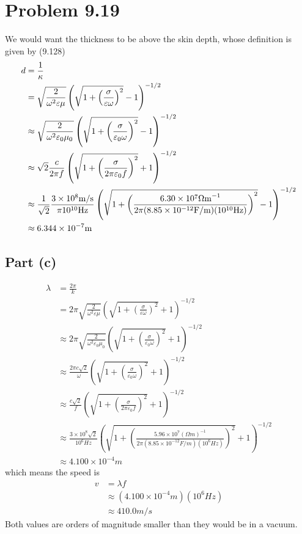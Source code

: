 \documentclass[12pt]{article}
\newcommand{\enterProblemHeader}[1]{
	\rhead{#1}
}
\newenvironment{homeworkProblem}[1]{
    \section{Problem #1}
    \enterProblemHeader{#1}
}{
	\pagebreak
}
\begin{document}
\begin{homeworkProblem}{9.19}
	We would want the thickness to be above the skin depth, whose definition is
	given by (9.128)
	\begin{align*}
		d &= \frac 1 \kappa\\
		&= \sqrt{ \frac 2 { \omega^2 \varepsilon \mu }} \left( \sqrt{1 + \left(
		\frac \sigma {\varepsilon \omega} \right)^2 } - 1 \right)^{-1/2}\\
		&\approx \sqrt{ \frac 2 { \omega^2 \varepsilon_0 \mu_0 }} \left( \sqrt{1 +
		\left( \frac \sigma {\varepsilon_0 \omega} \right)^2 } - 1
		\right)^{-1/2}\\
		&\approx \sqrt{2} \frac c {2 \pi f} \left( \sqrt{ 1 + \left( \frac
		\sigma {2 \pi \varepsilon_0 f} \right)^2 } + 1 \right)^{-1/2}\\
		&\approx \frac 1 {\sqrt 2} \frac {3 \times 10^8 \si{m/ \cancel s}} {\pi
		10^{10} \si{Hz} } \left( \sqrt{1 + \left( \frac {6.30 \times 10^7
		\si{\Omega m}^{-1} } {2 \pi (8.85 \times 10^{-12} \si{F/m}) (10^{10}
		\si{Hz}) } \right)^2 } - 1 \right)^{-1/2}\\
		&\approx 6.344 \times 10^{-7} \si{m}
	\end{align*}

	\subsection{Part (c)}
	\begin{align*}
		\lambda &= \frac {2 \pi} k\\
		&= 2 \pi \sqrt{ \frac 2 { \omega^2 \varepsilon \mu }} \left( \sqrt{1 +
		\left( \frac \sigma {\varepsilon \omega} \right)^2 } + 1
		\right)^{-1/2}\\
		&\approx 2 \pi \sqrt{ \frac 2 { \omega^2 \varepsilon_0 \mu_0 }} \left(
		\sqrt{1 + \left( \frac \sigma {\varepsilon_0 \omega} \right)^2 } + 1
		\right)^{-1/2}\\
		&\approx \frac {2 \pi c \sqrt 2} \omega \left( \sqrt{1 + \left( \frac
		\sigma {\varepsilon_0 \omega} \right)^2 } + 1 \right)^{-1/2}\\
		&\approx \frac {c \sqrt 2} f \left( \sqrt{1 + \left( \frac \sigma {2 \pi
		\varepsilon_0 f} \right)^2 } + 1 \right)^{-1/2}\\
		&\approx \frac {3 \times 10^8 \sqrt{2}} {10^6 \si{Hz}} \left( \sqrt{ 1 +
		\left( \frac {5.96 \times 10^7 (\si{\Omega m})^{-1}} {2 \pi (8.85 \times
		10^{-12} \si{F/m}) (10^6 \si{Hz})} \right)^2 } + 1 \right)^{-1/2}\\
		&\approx 4.100 \times 10^{-4} \si{m}
	\end{align*}
	which means the speed is
	\begin{align*}
		v &= \lambda f\\
		&\approx (4.100 \times 10^{-4} \si{m}) (10^6 \si{Hz})\\
		&\approx 410.0 \si{m/s}
	\end{align*}
	Both values are orders of magnitude smaller than they would be in a vacuum.

\end{homeworkProblem}
\end{document}
